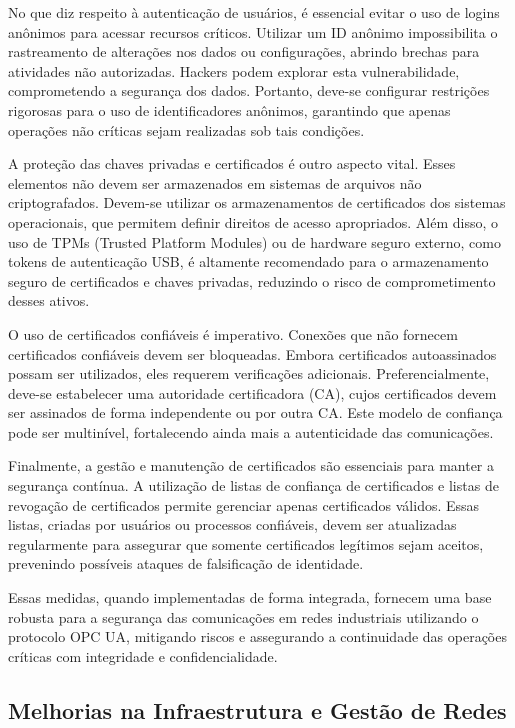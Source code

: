 No que diz respeito à autenticação de usuários, é essencial evitar o uso de logins anônimos para acessar recursos críticos. Utilizar um ID anônimo impossibilita o rastreamento de alterações nos dados ou configurações, abrindo brechas para atividades não autorizadas. Hackers podem explorar esta vulnerabilidade, comprometendo a segurança dos dados. Portanto, deve-se configurar restrições rigorosas para o uso de identificadores anônimos, garantindo que apenas operações não críticas sejam realizadas sob tais condições.

A proteção das chaves privadas e certificados é outro aspecto vital. Esses elementos não devem ser armazenados em sistemas de arquivos não criptografados. Devem-se utilizar os armazenamentos de certificados dos sistemas operacionais, que permitem definir direitos de acesso apropriados. Além disso, o uso de TPMs (Trusted Platform Modules) ou de hardware seguro externo, como tokens de autenticação USB, é altamente recomendado para o armazenamento seguro de certificados e chaves privadas, reduzindo o risco de comprometimento desses ativos.

O uso de certificados confiáveis é imperativo. Conexões que não fornecem certificados confiáveis devem ser bloqueadas. Embora certificados autoassinados possam ser utilizados, eles requerem verificações adicionais. Preferencialmente, deve-se estabelecer uma autoridade certificadora (CA), cujos certificados devem ser assinados de forma independente ou por outra CA. Este modelo de confiança pode ser multinível, fortalecendo ainda mais a autenticidade das comunicações.

Finalmente, a gestão e manutenção de certificados são essenciais para manter a segurança contínua. A utilização de listas de confiança de certificados e listas de revogação de certificados permite gerenciar apenas certificados válidos. Essas listas, criadas por usuários ou processos confiáveis, devem ser atualizadas regularmente para assegurar que somente certificados legítimos sejam aceitos, prevenindo possíveis ataques de falsificação de identidade.

Essas medidas, quando implementadas de forma integrada, fornecem uma base robusta para a segurança das comunicações em redes industriais utilizando o protocolo OPC UA, mitigando riscos e assegurando a continuidade das operações críticas com integridade e confidencialidade.

\subsection{Melhorias na Infraestrutura e Gestão de Redes}

